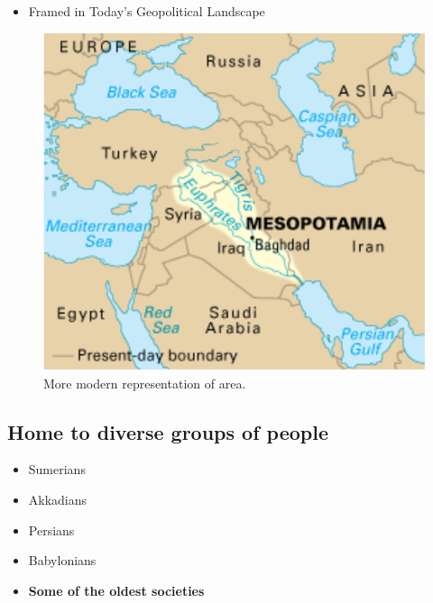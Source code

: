 \documentclass[11pt]{article}
\begin{document}
\begin{itemize}
\item Framed in Today's Geopolitical Landscape
\end{itemize}
\begin{figure}[htb]
\centering
\includegraphics[width=.9\linewidth]{./img/GeoLand.png}
\caption{More modern representation of area.}
\end{figure}

\subsection{Home to diverse groups of people}
\label{sec-3-4}
\begin{itemize}
\item Sumerians

\item Akkadians

\item Persians

\item Babylonians

\item \textbf{Some of the oldest societies}
\end{itemize}
\end{document}

